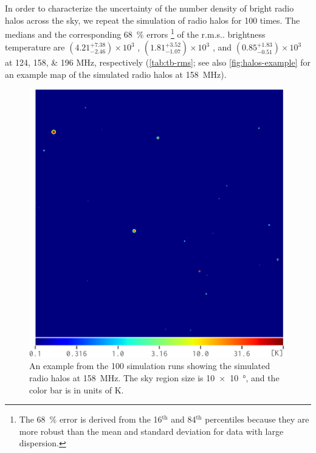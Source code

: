 \documentclass[twocolumn]{aastex62}
\makeatletter
\newcommand{\rms}{r.m.s\@ifnextchar.{}{.\@}}
\newcommand{\editone}[1]{{\leavevmode\color{cyan}#1}}
\makeatother
\begin{document}
In order to characterize the uncertainty of the number density of bright
radio halos across the sky, we repeat the simulation of radio halos
for 100 times.
The medians and the corresponding \SI{68}{\percent} errors%
\footnote{The \SI{68}{\percent} error is derived from the 16$^{\text{th}}$
and 84$^{\text{th}}$ percentiles because they are more robust than the mean
and standard deviation for data with large dispersion.}
of the \rms{} brightness temperature are \editone{%
$\left(4.21_{-2.46}^{+7.38}\right) \times 10^3$ \si{\mK},
$\left(1.81_{-1.07}^{+3.52}\right) \times 10^3$ \si{\mK}, and
$\left(0.85_{-0.51}^{+1.83}\right) \times 10^3$ \si{\mK}}
at \numlist{124;158;196} \si{\MHz}, respectively
(\autoref{tab:tb-rms}; see also \autoref{fig:halos-example} for an
example map of the simulated radio halos at \SI{158}{\MHz}).

\begin{figure}
  \centering
  \includegraphics[width=\columnwidth]{halos-f158}
  \caption{\label{fig:halos-example}%
    An example from the 100 simulation runs showing the simulated
    radio halos at \SI{158}{\MHz}.
    The sky region size is \SI[product-units=repeat]{10 x 10}{\degree},
    and the color bar is in units of \si{\kelvin}.
  }
\end{figure}
\end{document}
